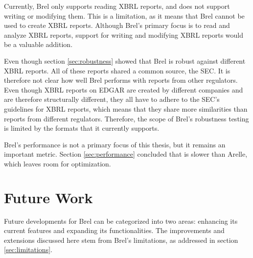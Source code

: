 Currently, Brel only supports reading XBRL reports, and does not support writing or modifying them.
This is a limitation, as it means that Brel cannot be used to create XBRL reports.
Although Brel's primary focus is to read and analyze XBRL reports,
support for writing and modifying XBRL reports would be a valuable addition.

Even though section \ref{sec:robustness} showed that Brel is robust against different XBRL reports.
All of these reports shared a common source, the SEC.
It is therefore not clear how well Brel performs with reports from other regulators.
Even though XBRL reports on EDGAR are created by different companies and are therefore structurally different,
they all have to adhere to the SEC's guidelines for XBRL reports, 
which means that they share more similarities than reports from different regulators.
Therefore, the scope of Brel's robustness testing is limited by the formats that it currently supports.

Brel's performance is not a primary focus of this thesis, but it remains an important metric.
Section \ref{sec:performance} concluded that is slower than Arelle, which leaves room for optimization.


\section{Future Work}

Future developments for Brel can be categorized into two areas: 
\textcolor{airforceblue}{enhancing its current features}
and 
\textcolor{turkishrose}{expanding its functionalities}. 
The improvements and extensions discussed here stem from Brel's limitations, 
as addressed in section \ref{sec:limitations}.

